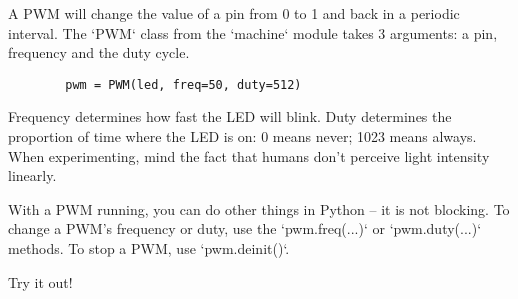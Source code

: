 \documentclass{../tutorial}
\begin{document}
\begin{enumerate}
    \begin{figure}[h]
        \centering
    \end{figure}

    A PWM will change the value of a pin from 0 to 1 and back in a periodic interval.
    The `PWM` class from the `machine` module takes 3 arguments:
    a pin, frequency and the duty cycle.

    \begin{lstlisting}
        pwm = PWM(led, freq=50, duty=512)
    \end{lstlisting}

    Frequency determines how fast the LED will blink.
    Duty determines the proportion of time where the LED is on: 0 means never;
    1023 means always.
    When experimenting, mind the fact that humans don't perceive light intensity linearly.

    With a PWM running, you can do other things in Python -- it is not blocking.
    To change a PWM's frequency or duty, use the `pwm.freq(...)`
    or `pwm.duty(...)` methods.
    To stop a PWM, use `pwm.deinit()`.

    Try it out!

\end{enumerate}
\end{document}
